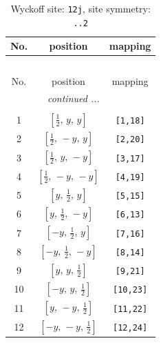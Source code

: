 \documentclass[fleqn,8pt]{jsarticle}
\begin{document}
\begin{longtable}{ccc}
\caption{Wyckoff site: {\tt 12j}, site symmetry: {\tt ..2}}
 \\
 \hline \hline
No. & position & mapping \\ \hline \endfirsthead

\multicolumn{2}{l}{\tablename\ \thetable{}} \\
 \hline \hline
No. & position & mapping \\ \hline \endhead

 \hline \hline
\multicolumn{2}{r}{\footnotesize\it continued ...} \\ \endfoot

 \hline \hline
\multicolumn{2}{r}{} \\ \endlastfoot

1 & $\left[ \frac{1}{2},\, y,\, y \right]$ & {\tt [1,18]} \\ \hline
2 & $\left[ \frac{1}{2},\, - y,\, y \right]$ & {\tt [2,20]} \\ \hline
3 & $\left[ \frac{1}{2},\, y,\, - y \right]$ & {\tt [3,17]} \\ \hline
4 & $\left[ \frac{1}{2},\, - y,\, - y \right]$ & {\tt [4,19]} \\ \hline
5 & $\left[ y,\, \frac{1}{2},\, y \right]$ & {\tt [5,15]} \\ \hline
6 & $\left[ y,\, \frac{1}{2},\, - y \right]$ & {\tt [6,13]} \\ \hline
7 & $\left[ - y,\, \frac{1}{2},\, y \right]$ & {\tt [7,16]} \\ \hline
8 & $\left[ - y,\, \frac{1}{2},\, - y \right]$ & {\tt [8,14]} \\ \hline
9 & $\left[ y,\, y,\, \frac{1}{2} \right]$ & {\tt [9,21]} \\ \hline
10 & $\left[ - y,\, y,\, \frac{1}{2} \right]$ & {\tt [10,23]} \\ \hline
11 & $\left[ y,\, - y,\, \frac{1}{2} \right]$ & {\tt [11,22]} \\ \hline
12 & $\left[ - y,\, - y,\, \frac{1}{2} \right]$ & {\tt [12,24]} \\
\end{longtable}
\renewcommand{\arraystretch}{1.2}
\end{document}
